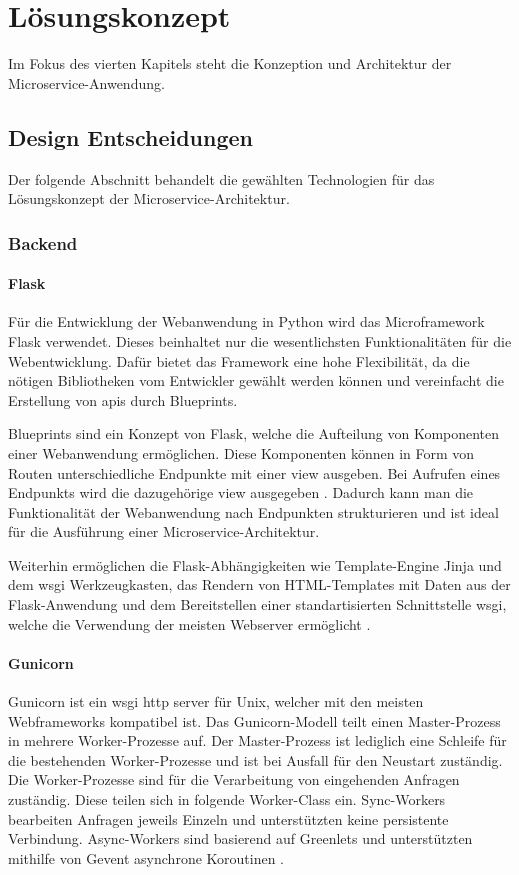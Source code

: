 \chapter{Lösungskonzept}
Im Fokus des vierten Kapitels steht die Konzeption und Architektur der Microservice-Anwendung.

\section{Design Entscheidungen}

Der folgende Abschnitt behandelt die gewählten Technologien für das Lösungskonzept der Microservice-Architektur.

\subsection{Backend}

\subsubsection{Flask}
Für die Entwicklung der Webanwendung in Python wird das Microframework Flask verwendet.
Dieses beinhaltet nur die wesentlichsten Funktionalitäten für die Webentwicklung.
Dafür bietet das Framework eine hohe Flexibilität, da die nötigen Bibliotheken vom Entwickler gewählt werden können \cite{flaskdocu} und
vereinfacht die Erstellung von \acs{api}s \cite[S.11]{restfulpython} durch Blueprints.

Blueprints sind ein Konzept von Flask, welche die Aufteilung von Komponenten einer Webanwendung ermöglichen.
Diese Komponenten können in Form von Routen unterschiedliche Endpunkte mit einer view ausgeben.
Bei Aufrufen eines Endpunkts wird die dazugehörige view ausgegeben \cite{flaskdocu}.
Dadurch kann man die Funktionalität der Webanwendung nach Endpunkten strukturieren und ist ideal für die Ausführung einer Microservice-Architektur.

Weiterhin ermöglichen die Flask-Abhängigkeiten wie Template-Engine Jinja und dem \acs{wsgi} Werkzeugkasten,
das Rendern von HTML-Templates mit Daten aus der Flask-Anwendung
und dem Bereitstellen einer standartisierten Schnittstelle \ac{wsgi}, welche die Verwendung der meisten Webserver ermöglicht \cite{flaskdocu}.


\subsubsection{Gunicorn}
Gunicorn ist ein \acs{wsgi} \acs{http} server für Unix, welcher mit den meisten Webframeworks kompatibel ist.
Das Gunicorn-Modell teilt einen Master-Prozess in mehrere Worker-Prozesse auf.
Der Master-Prozess ist lediglich eine Schleife für die bestehenden Worker-Prozesse
und ist bei Ausfall für den Neustart zuständig.
Die Worker-Prozesse sind für die Verarbeitung von eingehenden Anfragen zuständig.
Diese teilen sich in folgende Worker-Class ein. 
Sync-Workers bearbeiten Anfragen jeweils Einzeln und unterstützten keine persistente Verbindung.
Async-Workers sind basierend auf Greenlets und unterstützten mithilfe von Gevent asynchrone Koroutinen \cite{gunciorndocs}. 

